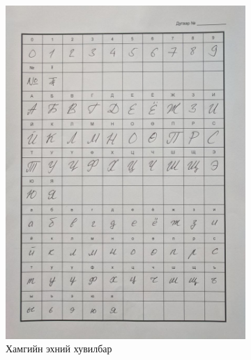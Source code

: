 \begin{figure}[H]
	\begin{subfigure}{0.5\textwidth}
		\includegraphics[width=0.9\linewidth]{images/sheet_1}
		\caption{Хамгийн эхний хувилбар}
		\label{fig:sheet_1}
	\end{subfigure}
	\begin{subfigure}{0.52\textwidth}

\end{subfigure}
\end{figure}
